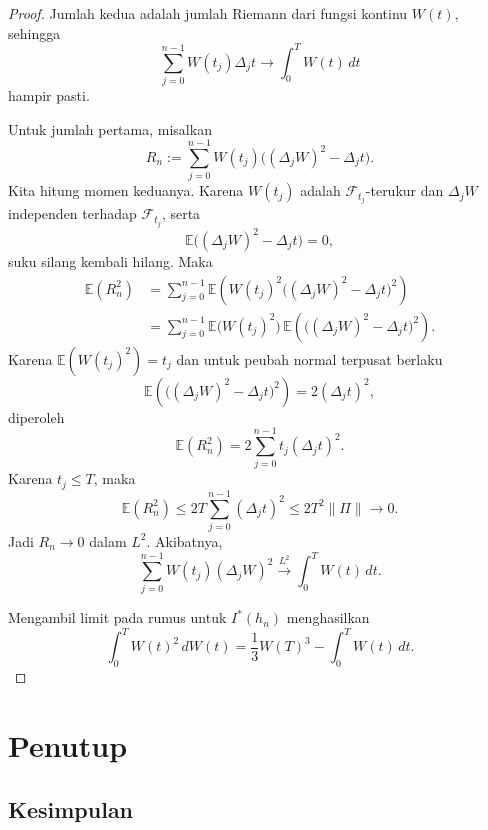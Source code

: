 \documentclass[12pt,a4paper]{article}
\theoremstyle{definition}
\theoremstyle{plain}
\newcommand{\E}{\mathbb{E}}
\newcommand{\F}{\mathcal{F}}
\begin{document}
\begin{proof}
  Jumlah kedua adalah jumlah Riemann dari fungsi kontinu $W(t)$, sehingga
  \[
    \sum_{j=0}^{n-1}W(t_j)\Delta_jt
    \to
    \int_0^T W(t)\,dt
  \]
  hampir pasti.

  Untuk jumlah pertama, misalkan
  \[
    R_n:=\sum_{j=0}^{n-1}W(t_j)\bigl((\Delta_jW)^2-\Delta_jt\bigr).
  \]
  Kita hitung momen keduanya. Karena $W(t_j)$ adalah $\F_{t_j}$-terukur dan
  $\Delta_jW$ independen terhadap $\F_{t_j}$, serta
  \[
    \E\bigl((\Delta_jW)^2-\Delta_jt\bigr)=0,
  \]
  suku silang kembali hilang. Maka
  \begin{align*}
    \E(R_n^2)
     & =
    \sum_{j=0}^{n-1}
    \E\left(
    W(t_j)^2\bigl((\Delta_jW)^2-\Delta_jt\bigr)^2
    \right) \\
     & =
    \sum_{j=0}^{n-1}
    \E\bigl(W(t_j)^2\bigr)\,
    \E\left(\bigl((\Delta_jW)^2-\Delta_jt\bigr)^2\right).
  \end{align*}
  Karena $\E(W(t_j)^2)=t_j$ dan untuk peubah normal terpusat berlaku
  \[
    \E\left(\bigl((\Delta_jW)^2-\Delta_jt\bigr)^2\right)=2(\Delta_jt)^2,
  \]
  diperoleh
  \[
    \E(R_n^2)=2\sum_{j=0}^{n-1}t_j(\Delta_jt)^2.
  \]
  Karena $t_j\le T$, maka
  \[
    \E(R_n^2)
    \le
    2T\sum_{j=0}^{n-1}(\Delta_jt)^2
    \le
    2T^2\|\Pi\|\to 0.
  \]
  Jadi $R_n\to 0$ dalam $L^2$. Akibatnya,
  \[
    \sum_{j=0}^{n-1}W(t_j)(\Delta_jW)^2
    \xrightarrow{L^2}
    \int_0^T W(t)\,dt.
  \]

  Mengambil limit pada rumus untuk $I^\ast(h_n)$ menghasilkan
  \[
    \int_0^T W(t)^2\,dW(t)
    =
    \frac13W(T)^3-\int_0^T W(t)\,dt.
  \]
\end{proof}

\section{Penutup}

\subsection{Kesimpulan}
\end{document}
